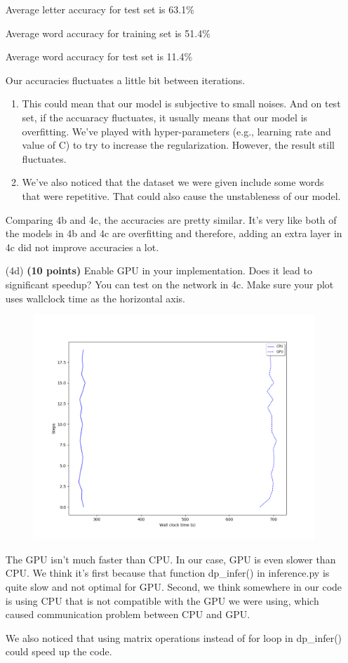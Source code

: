 \documentclass[11pt]{report}
\begin{document}
\begin{itemize}
Average letter accuracy for test set is 63.1\%

Average word accuracy for training set is 51.4\%

Average word accuracy for test set is 11.4\%

Our accuracies fluctuates a little bit between iterations. 
\begin{enumerate}
	\item This could mean that our model is subjective to small noises. And on test set, if the accuaracy fluctuates, it usually means that our model is overfitting. We've played with hyper-parameters (e.g., learning rate and value of C) to try to increase the regularization. However, the result still fluctuates.
	\item We've also noticed that the dataset we were given include some words that were repetitive. That could also cause the unstableness of our model. 
\end{enumerate}

Comparing 4b and 4c, the accuracies are pretty similar. It's very like both of the models in 4b and 4c are overfitting and therefore, adding an extra layer in 4c did not improve accuracies a lot. 

\clearpage
\item [(4d)] {\bf (10 points)} Enable GPU in your implementation. Does it lead
  to significant speedup? You can test on the network in 4c. Make sure your plot
  uses wallclock time as the horizontal axis.

\begin{figure}[h]
	\includegraphics[width = 15 cm]{./walltime.png}
	\centering
\end{figure}

The GPU isn't much faster than CPU. 
In our case, GPU is even slower than CPU. 
We think it's first because that function dp\_infer() in inference.py is quite slow and not optimal for GPU.
Second, we think somewhere in our code is using CPU that is not compatible with the GPU we were using, which caused communication problem between CPU and GPU. 

We also noticed that using matrix operations instead of for loop in dp\_infer() could speed up the code. 


\end{itemize}
\end{document}
